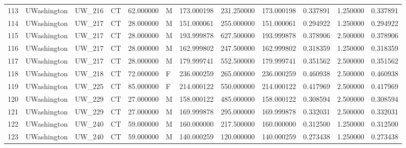 \begin{tabular}{llllrlrrrrrr}
113    &     UWashington &       UW\_216 &                 CT &  62.000000 &        M &       173.000198 &    231.250000 &  173.000198 &               0.337891 &            1.250000 &          0.337891 \\
114    &     UWashington &       UW\_217 &                 CT &  28.000000 &        M &       151.000061 &    255.000000 &  151.000061 &               0.294922 &            1.250000 &          0.294922 \\
115    &     UWashington &       UW\_217 &                 CT &  28.000000 &        M &       193.999878 &    627.500000 &  193.999878 &               0.378906 &            2.500000 &          0.378906 \\
116    &     UWashington &       UW\_217 &                 CT &  28.000000 &        M &       162.999802 &    247.500000 &  162.999802 &               0.318359 &            1.250000 &          0.318359 \\
117    &     UWashington &       UW\_217 &                 CT &  28.000000 &        M &       179.999741 &    552.500000 &  179.999741 &               0.351562 &            2.500000 &          0.351562 \\
118    &     UWashington &       UW\_218 &                 CT &  72.000000 &        F &       236.000259 &    265.000000 &  236.000259 &               0.460938 &            2.500000 &          0.460938 \\
119    &     UWashington &       UW\_225 &                 CT &  85.000000 &        F &       214.000122 &    550.000000 &  214.000122 &               0.417969 &            2.500000 &          0.417969 \\
120    &     UWashington &       UW\_229 &                 CT &  27.000000 &        M &       158.000122 &    485.000000 &  158.000122 &               0.308594 &            2.500000 &          0.308594 \\
121    &     UWashington &       UW\_229 &                 CT &  27.000000 &        M &       169.999878 &    295.000000 &  169.999878 &               0.332031 &            2.500000 &          0.332031 \\
122    &     UWashington &       UW\_240 &                 CT &  59.000000 &        M &       160.000000 &    217.500000 &  160.000000 &               0.312500 &            1.250000 &          0.312500 \\
123    &     UWashington &       UW\_240 &                 CT &  59.000000 &        M &       140.000259 &    120.000000 &  140.000259 &               0.273438 &            1.250000 &          0.273438 \\

\end{tabular}

